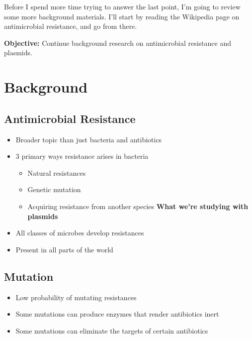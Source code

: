 \documentclass[oneside]{labbook}
\newcommand{\obj}[1]{\textbf{Objective:} #1}
\begin{document}
Before I spend more time trying to answer the last point, I'm going to review some
more background materials. I'll start by reading the Wikipedia page on antimicrobial
resistance, and go from there.


\obj{Continue background research on antimicrobial resistance and plasmids.}

\section{Background}
\subsection*{Antimicrobial Resistance}

\begin {itemize}[label={--}]
\item Broader topic than just bacteria and antibiotics
\item 3 primary ways resistance arises in bacteria
\begin{itemize}
  \item Natural resistances
  \item Genetic mutation
  \item Acquiring resistance from another species \textbf{What we're studying with plasmids}
\end{itemize}
\item All classes of microbes develop resistances
\item Present in all parts of the world
\end{itemize}


\subsection*{Mutation}
\begin{itemize}
  \item Low probability of mutating resistances
  \item Some mutations can produce enzymes that render antibiotics inert
  \item Some mutations can eliminate the targets of certain antibiotics
\end{itemize}
\end{document}
